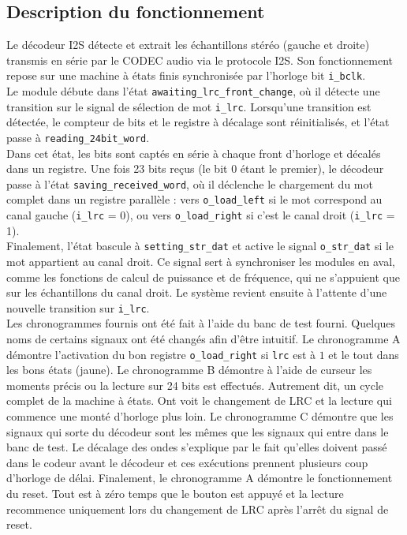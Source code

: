 

\subsection{Description du fonctionnement}

Le décodeur I2S détecte et extrait les échantillons stéréo (gauche et droite)
transmis en série par le CODEC audio via le protocole I2S. Son
fonctionnement repose sur une machine à états finis synchronisée par
l'horloge bit \verb|i_bclk|.\\

Le module débute dans l'état \verb|awaiting_lrc_front_change|, où il détecte
une transition sur le signal de sélection de mot \verb|i_lrc|. Lorsqu'une transition
est détectée, le compteur de bits et le registre à décalage sont réinitialisés,
et l'état passe à \verb|reading_24bit_word|.\\

Dans cet état, les bits sont captés en série à chaque front d'horloge et
décalés dans un registre. Une fois 23 bits reçus (le bit 0 étant le premier),
le décodeur passe à l'état \verb|saving_received_word|, où il déclenche le chargement
du mot complet dans un registre parallèle : vers \verb|o_load_left| si le mot
correspond au canal gauche (\verb|i_lrc| = 0), ou vers \verb|o_load_right| si
c'est le canal droit (\verb|i_lrc| = 1).\\

Finalement, l'état bascule à \verb|setting_str_dat| et active le signal \verb|o_str_dat| si le mot
appartient au canal droit. Ce signal sert à synchroniser les modules en aval,
comme les fonctions de calcul de puissance et de fréquence, qui ne s'appuient
que sur les échantillons du canal droit. Le système revient ensuite à l'attente
d'une nouvelle transition sur \verb|i_lrc|.\\

Les chronogrammes fournis ont été fait à l'aide du banc de test fourni. Quelques noms de certains signaux ont été changés afin d'être intuitif. 
Le chronogramme A démontre l'activation du bon registre \verb|o_load_right| si \verb|lrc| est à $1$ et le tout dans les bons états (jaune). Le chronogramme B 
démontre à l'aide de curseur les moments précis ou la lecture sur 24 bits est effectués. Autrement dit, un cycle complet de la machine à états. Ont voit le 
changement de LRC et la lecture qui commence une monté d'horloge plus loin. Le chronogramme C démontre que les signaux qui sorte du décodeur sont les mêmes
que les signaux qui entre dans le banc de test. Le décalage des ondes s'explique par le fait qu'elles doivent passé dans le codeur avant le décodeur et ces
exécutions prennent plusieurs coup d'horloge de délai. Finalement, le chronogramme A démontre le fonctionnement du reset. Tout est à zéro temps que le bouton
est appuyé et la lecture recommence uniquement lors du changement de LRC après l'arrêt du signal de reset.

